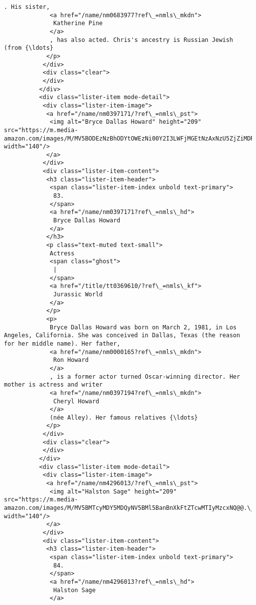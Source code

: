 \documentclass[11pt]{article}
\begin{document}
\begin{Verbatim}[commandchars=\\\{\}]
             . His sister,
             <a href="/name/nm0683977?ref\_=nmls\_mkdn">
              Katherine Pine
             </a>
             , has also acted. Chris's ancestry is Russian Jewish (from {\ldots}
            </p>
           </div>
           <div class="clear">
           </div>
          </div>
          <div class="lister-item mode-detail">
           <div class="lister-item-image">
            <a href="/name/nm0397171/?ref\_=nmls\_pst">
             <img alt="Bryce Dallas Howard" height="209" src="https://m.media-amazon.com/images/M/MV5BODEzNzBhODYtOWEzNi00Y2I3LWFjMGEtNzAxNzU5ZjZiMDRiXkEyXkFqcGdeQXVyMjQ0MTg4Nw@@.\_V1\_UY209\_CR10,0,140,209\_AL\_.jpg" width="140"/>
            </a>
           </div>
           <div class="lister-item-content">
            <h3 class="lister-item-header">
             <span class="lister-item-index unbold text-primary">
              83.
             </span>
             <a href="/name/nm0397171?ref\_=nmls\_hd">
              Bryce Dallas Howard
             </a>
            </h3>
            <p class="text-muted text-small">
             Actress
             <span class="ghost">
              |
             </span>
             <a href="/title/tt0369610/?ref\_=nmls\_kf">
              Jurassic World
             </a>
            </p>
            <p>
             Bryce Dallas Howard was born on March 2, 1981, in Los Angeles, California. She was conceived in Dallas, Texas (the reason for her middle name). Her father,
             <a href="/name/nm0000165?ref\_=nmls\_mkdn">
              Ron Howard
             </a>
             , is a former actor turned Oscar-winning director. Her mother is actress and writer
             <a href="/name/nm0397194?ref\_=nmls\_mkdn">
              Cheryl Howard
             </a>
             (née Alley). Her famous relatives {\ldots}
            </p>
           </div>
           <div class="clear">
           </div>
          </div>
          <div class="lister-item mode-detail">
           <div class="lister-item-image">
            <a href="/name/nm4296013/?ref\_=nmls\_pst">
             <img alt="Halston Sage" height="209" src="https://m.media-amazon.com/images/M/MV5BMTcyMDY5MDQyNV5BMl5BanBnXkFtZTcwMTIyMzcxNQ@@.\_V1\_UY209\_CR13,0,140,209\_AL\_.jpg" width="140"/>
            </a>
           </div>
           <div class="lister-item-content">
            <h3 class="lister-item-header">
             <span class="lister-item-index unbold text-primary">
              84.
             </span>
             <a href="/name/nm4296013?ref\_=nmls\_hd">
              Halston Sage
             </a>

\end{Verbatim}
\end{document}
